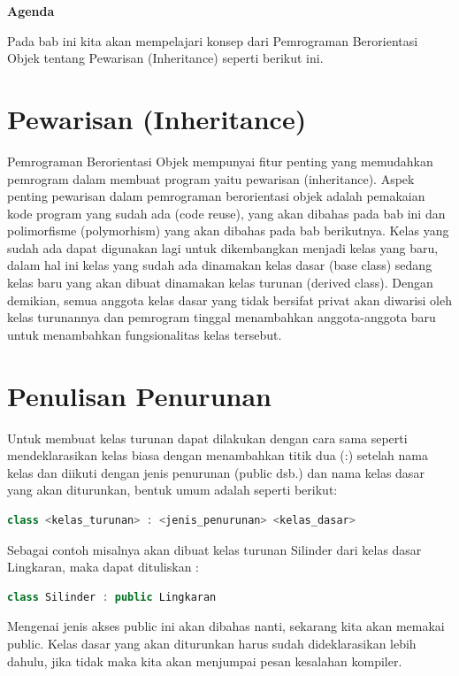 \textbf{Agenda}

Pada bab ini kita akan mempelajari konsep dari Pemrograman Berorientasi Objek
tentang Pewarisan (Inheritance) seperti berikut ini.

\minitoc

\section{Pewarisan (Inheritance)}\label{pewarisan-inheritance}

Pemrograman Berorientasi Objek mempunyai fitur penting yang memudahkan
pemrogram dalam membuat program yaitu pewarisan (inheritance). Aspek
penting pewarisan dalam pemrograman berorientasi objek adalah pemakaian
kode program yang sudah ada (code reuse), yang akan dibahas pada bab ini
dan polimorfisme (polymorhism) yang akan dibahas pada bab berikutnya.
Kelas yang sudah ada dapat digunakan lagi untuk dikembangkan menjadi
kelas yang baru, dalam hal ini kelas yang sudah ada dinamakan kelas
dasar (base class) sedang kelas baru yang akan dibuat dinamakan kelas
turunan (derived class). Dengan demikian, semua anggota kelas dasar yang
tidak bersifat privat akan diwarisi oleh kelas turunannya dan pemrogram
tinggal menambahkan anggota-anggota baru untuk menambahkan
fungsionalitas kelas tersebut.

\section{Penulisan Penurunan}\label{penulisan-penurunan}

Untuk membuat kelas turunan dapat dilakukan dengan cara sama seperti
mendeklarasikan kelas biasa dengan menambahkan titik dua (:) setelah
nama kelas dan diikuti dengan jenis penurunan (public dsb.) dan nama
kelas dasar yang akan diturunkan, bentuk umum adalah seperti berikut:

\begin{lstlisting}[language=c++, numbers=none]
class <kelas_turunan> : <jenis_penurunan> <kelas_dasar>
\end{lstlisting}

Sebagai contoh misalnya akan dibuat kelas turunan Silinder dari kelas
dasar Lingkaran, maka dapat dituliskan :

\begin{lstlisting}[language=c++, numbers=none]
class Silinder : public Lingkaran
\end{lstlisting}

Mengenai jenis akses public ini akan dibahas nanti, sekarang kita akan
memakai public. Kelas dasar yang akan diturunkan harus sudah
dideklarasikan lebih dahulu, jika tidak maka kita akan menjumpai pesan
kesalahan kompiler.

